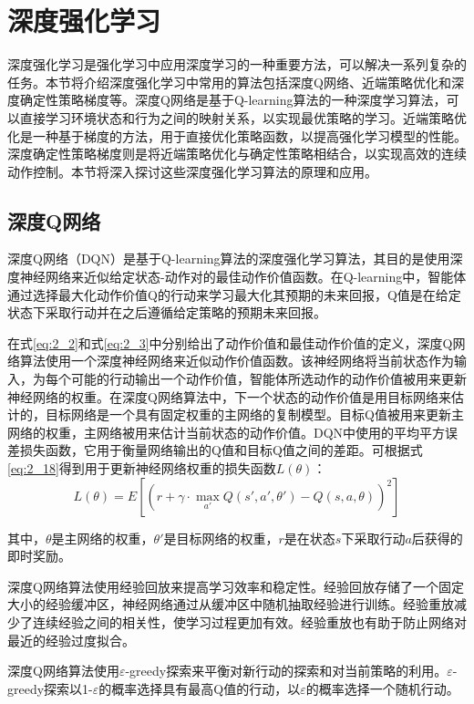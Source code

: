 \section{深度强化学习}
\label{section:2.3}

深度强化学习是强化学习中应用深度学习的一种重要方法，可以解决一系列复杂的任务。本节将介绍深度强化学习中常用的算法包括深度Q网络、近端策略优化和深度确定性策略梯度等。深度Q网络是基于Q-learning算法的一种深度学习算法，可以直接学习环境状态和行为之间的映射关系，以实现最优策略的学习。近端策略优化是一种基于梯度的方法，用于直接优化策略函数，以提高强化学习模型的性能。深度确定性策略梯度则是将近端策略优化与确定性策略相结合，以实现高效的连续动作控制。本节将深入探讨这些深度强化学习算法的原理和应用。

\subsection{深度Q网络}

深度Q网络（DQN）是基于Q-learning算法的深度强化学习算法，其目的是使用深度神经网络来近似给定状态-动作对的最佳动作价值函数。在Q-learning中，智能体通过选择最大化动作价值Q的行动来学习最大化其预期的未来回报，Q值是在给定状态下采取行动并在之后遵循给定策略的预期未来回报。

在式\ref{eq:2_2}和式\ref{eq:2_3}中分别给出了动作价值和最佳动作价值的定义，深度Q网络算法使用一个深度神经网络来近似动作价值函数。该神经网络将当前状态作为输入，为每个可能的行动输出一个动作价值，智能体所选动作的动作价值被用来更新神经网络的权重。在深度Q网络算法中，下一个状态的动作价值是用目标网络来估计的，目标网络是一个具有固定权重的主网络的复制模型。目标Q值被用来更新主网络的权重，主网络被用来估计当前状态的动作价值。DQN中使用的平均平方误差损失函数，它用于衡量网络输出的Q值和目标Q值之间的差距。可根据式\ref{eq:2_18}得到用于更新神经网络权重的损失函数$L(\theta)$：
\begin{equation}
\label{eq:2_22}
L(\theta) = E\left[\left(r + \gamma \cdot \max _{a'} Q(s', a', \theta') - Q(s, a, \theta)\right)^2\right ]
\end{equation}


其中，$\theta$是主网络的权重，$\theta '$是目标网络的权重，$r$是在状态$s$下采取行动$a$后获得的即时奖励。

深度Q网络算法使用经验回放来提高学习效率和稳定性。经验回放存储了一个固定大小的经验缓冲区，神经网络通过从缓冲区中随机抽取经验进行训练。经验重放减少了连续经验之间的相关性，使学习过程更加有效。经验重放也有助于防止网络对最近的经验过度拟合。

深度Q网络算法使用$\varepsilon$-greedy探索来平衡对新行动的探索和对当前策略的利用。$\varepsilon$-greedy探索以1-$\varepsilon$的概率选择具有最高Q值的行动，以$\varepsilon$的概率选择一个随机行动。

